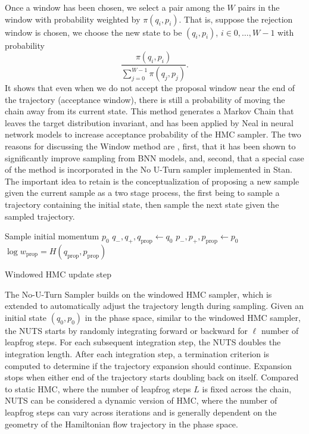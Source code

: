 \documentclass[12pt]{report}
\begin{document}
Once a window has been chosen, we select a pair among the $W$ pairs in the window with probability weighted by $\pi(q_i,p_i)$. That is, suppose the rejection window is chosen, we choose the new state to be $(q_i,p_i)$, $i \in {0,\dots,W-1}$ with probability 
\[ \frac{\pi(q_i,p_i)}{\sum_{j=0}^{W-1} \pi(q_j,p_j)}. \]
It shows that even when we do not accept the proposal window near the end of the trajectory (acceptance window), there is still a probability of moving the chain away from its current state. This method generates a Markov Chain that leaves the target distribution invariant, and has been applied by Neal in neural network models to increase acceptance probability of the HMC sampler\cite{neal1992improved}. The two reasons for discussing the Window method are , first,  that it has been shown to
significantly improve sampling from BNN models, and, second, that a special case of
the method is incorporated in the No U-Turn sampler implemented in Stan. The important idea to retain is the conceptualization of proposing a new sample given the current sample as a two stage process, the first being to sample a trajectory containing the initial state, then sample the next state given the sampled trajectory.

\begin{algorithm}
Sample initial momentum $p_0$ \;
$q_-,q_+, q_{\text{prop}} \leftarrow q_0$\;
$p_-,p_+, p_{\text{prop}} \leftarrow p_0$ \;
$\log w_{\text{prop}} = H(q_{\text{prop}},p_{\text{prop}}) $ \;

\caption{Windowed HMC update step}
\end{algorithm}

The No-U-Turn Sampler \cite{hoffman2014no} builds on the windowed HMC sampler, which is extended to automatically adjust the trajectory length during sampling. Given an initial state $(q_0,p_0)$ in the phase space, similar to the windowed HMC sampler, the NUTS starts by randomly integrating forward or backward for $\ell$ number of leapfrog steps. For each subsequent integration step, the NUTS doubles the integration length. After each integration step, a termination criterion is computed to determine if the trajectory expansion should continue. Expansion stops when either end of the trajectory starts doubling back on itself. Compared to static HMC, where the number of leapfrog steps $L$ is fixed across the chain, NUTS can be considered a dynamic version of HMC, where the number of leapfrog steps can vary across iterations and is generally dependent on the geometry of the Hamiltonian flow trajectory in the phase space. 
\end{document}
